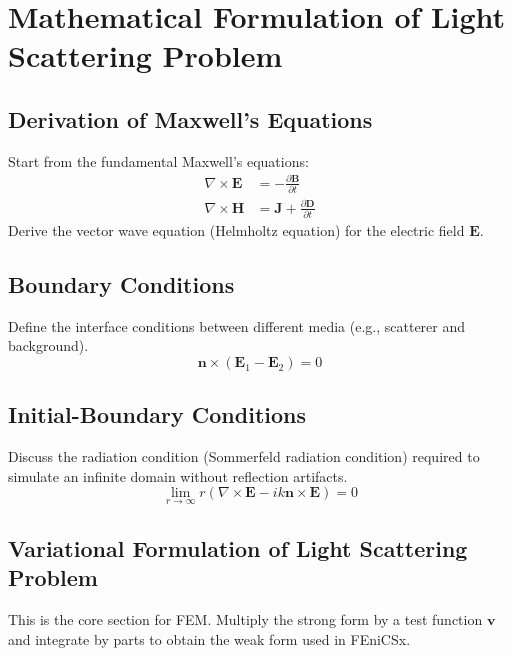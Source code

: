 
\chapter{Mathematical Formulation of Light Scattering Problem}
\label{chap:math_formulation}

\section{Derivation of Maxwell's Equations}
Start from the fundamental Maxwell's equations:
\begin{align}
    \nabla \times \bm{E} &= - \frac{\partial \bm{B}}{\partial t} \\
    \nabla \times \bm{H} &= \bm{J} + \frac{\partial \bm{D}}{\partial t}
\end{align}
Derive the vector wave equation (Helmholtz equation) for the electric field $\bm{E}$.

\section{Boundary Conditions}
Define the interface conditions between different media (e.g., scatterer and background).
\begin{equation}
    \bm{n} \times (\bm{E}_1 - \bm{E}_2) = 0
\end{equation}

\section{Initial-Boundary Conditions}
Discuss the radiation condition (Sommerfeld radiation condition) required to simulate an infinite domain without reflection artifacts.
\begin{equation}
    \lim_{r \to \infty} r \left( \nabla \times \bm{E} - ik \bm{n} \times \bm{E} \right) = 0
\end{equation}

\section{Variational Formulation of Light Scattering Problem}
This is the core section for FEM. Multiply the strong form by a test function $\bm{v}$ and integrate by parts to obtain the weak form used in FEniCSx.